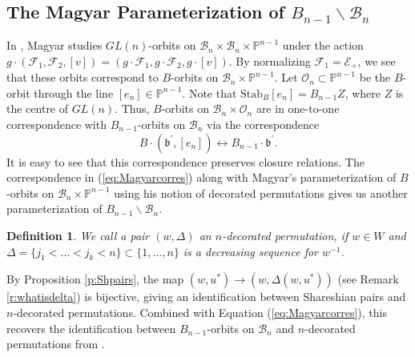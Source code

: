 \documentclass[12pt]{amsart}
\numberwithin{equation}{section}
\newtheorem{dfn}[thm]{Definition}
\newcommand{\fb}{\mbox{${\mathfrak b}$}}
\newcommand{\B}{\mathcal{B}}
\newcommand{\F}{\mathcal{F}}
\newcommand{\Borbitspace}{B_{n-1}\backslash\B_{n}}
\newcommand{\calO}{\mathcal{O}}
\begin{document}
\subsection{The Magyar Parameterization of $\Borbitspace$}\label{ss:Magyar}
In \cite{Magyar}, Magyar studies $GL(n)$-orbits on $\B_{n}\times\B_{n}\times\mathbb{P}^{n-1}$ under the action $g\cdot (\F_{1}, \F_{2}, [v])=(g\cdot \F_{1}, g\cdot \F_{2}, g\cdot [v])$.  By normalizing $\F_{1}=\mathcal{E}_{+}$, we see that these orbits correspond to 
$B$-orbits on $\B_{n}\times\mathbb{P}^{n-1}$.  Let $\mathcal{O}_{n}\subset \mathbb{P}^{n-1}$ be the $B$-orbit through the line $[e_{n}]\in \mathbb{P}^{n-1}$.  Note that $\mbox{Stab}_{B}[e_{n}]=B_{n-1}Z$, where $Z$ is the centre of $GL(n)$.  Thus, $B$-orbits on $\B_{n}\times \calO_{n}$ are in one-to-one correspondence with $B_{n-1}$-orbits on $\B_{n}$ via the correspondence
\begin{equation}\label{eq:Magyarcorres}
B\cdot(\fb^{\prime}, [e_{n}])\longleftrightarrow  B_{n-1}\cdot\fb^{\prime}.
\end{equation}
It is easy to see that this correspondence preserves closure relations. 
The correspondence in (\ref{eq:Magyarcorres}) along with Magyar's parameterization of $B$-orbits on $\B_{n}\times\mathbb{P}^{n-1}$ using his notion of decorated permutations gives us another parameterization of $\Borbitspace$.
\begin{dfn}\label{d:Magyar}
We call a pair $(w, \Delta)$ an $n$-decorated permutation, if $w\in W$ and $\Delta=\{j_{1}<\dots<j_{k}<n\}\subset \{1,\dots, n\}$ is a decreasing sequence for $w^{-1}$.  
\end{dfn}

By Proposition \ref{p:Shpairs}, the map $(w,u^*)\to (w,\Delta(w,u^*))$ (see Remark \ref{r:whatisdelta}) is bijective, giving an identification between Shareshian pairs and $n$-decorated permutations.  Combined with Equation (\ref{eq:Magyarcorres}), this recovers the identification between $B_{n-1}$-orbits on $\B_n$ and $n$-decorated permutations from \cite{Magyar}.
\end{document}
